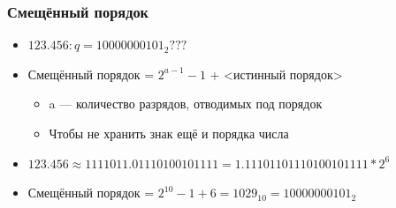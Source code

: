 \documentclass[xetex,mathserif,serif]{beamer}
\begin{document}
    \begin{frame}
        \frametitle{Смещённый порядок}
        \begin{itemize}
            \item $123.456:  q = 10000000101_2???$
            \item Смещённый порядок =  $2^{a - 1} - 1$ + <истинный порядок>
            \begin{itemize}
                \item a --- количество разрядов, отводимых под порядок
                \item Чтобы не хранить знак ещё и порядка числа
            \end{itemize}
            \item $123.456 \approx 1111011.01110100101111 = 1.11101101110100101111 * 2^6$
            \item Смещённый порядок = $2^{10} - 1 + 6 = 1029_{10} = 10000000101_2$
        \end{itemize}
    \end{frame}
\end{document}
